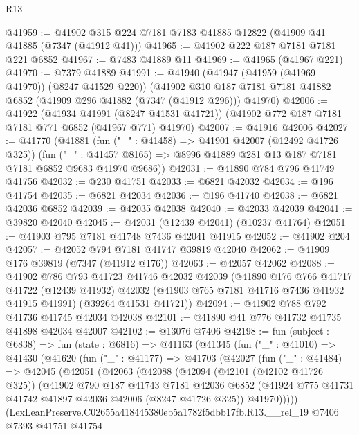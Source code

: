 \begin{lexlean}{R13}
\begin{coremodule}
@41959 := @41902 @315 @224 @7181 @7183 @41885 @12822 (@41909 @41 @41885 (@7347 (@41912 @41)))
@41965 := @41902 @222 @187 @7181 @7181 @221 @6852
@41967 := @7483 @41889 @11
@41969 := @41965 (@41967 @221)
@41970 := @7379 @41889
@41991 := @41940
    (@41947 (@41959 (@41969 @41970)) (@8247 @41529 @220))
    (@41902 @310 @187 @7181 @7181 @41882 @6852 (@41909 @296 @41882 (@7347 (@41912 @296))) @41970)
@42006 := @41922
    (@41934 @41991 (@8247 @41531 @41721))
    (@41902 @772 @187 @7181 @7181 @771 @6852 (@41967 @771) @41970)
@42007 := @41916 @42006
@42027 := @41770
    (@41881
      (fun ("_" : @41458) => @41901 @42007 (@12492 @41726 @325))
      (fun ("_" : @41457 @8165) => @8996 @41889 @281 @13 @187 @7181 @7181 @6852 @9683 @41970 @9686))
@42031 := @41890 @784 @796 @41749 @41756
@42032 := @230 @41751
@42033 := @6821 @42032
@42034 := @196 @41754
@42035 := @6821 @42034
@42036 := @196 @41740
@42038 := @6821 @42036 @6852
@42039 := @42035 @42038
@42040 := @42033 @42039
@42041 := @39820 @42040
@42045 := @42031 (@12439 @42041) (@10237 @41764)
@42051 := @41903 @795 @7181 @41748 @7436 @42041 @41915
@42052 := @41902 @204
@42057 := @42052 @794 @7181 @41747 @39819 @42040
@42062 := @41909 @176 @39819 (@7347 (@41912 @176))
@42063 := @42057 @42062
@42088 := @41902
    @786
    @793
    @41723
    @41746
    @42032
    @42039
    (@41890
      @176
      @766
      @41717
      @41722
      (@12439 @41932)
      @42032
      (@41903 @765 @7181 @41716 @7436 @41932 @41915 @41991)
      (@39264 @41531 @41721))
@42094 := @41902 @788 @792 @41736 @41745 @42034 @42038
@42101 := @41890 @41 @776 @41732 @41735 @41898 @42034 @42007
@42102 := @13076 @7406
@42198 := fun (subject : @6838) =>
  fun (state : @6816) =>
  @41163
    (@41345
      (fun ("_" : @41010) =>
      @41430
        (@41620
          (fun ("_" : @41177) =>
          @41703
            (@42027
              (fun ("_" : @41484) =>
              @42045
                (@42051
                  (@42063
                    (@42088
                      (@42094
                        (@42101 (@42102 @41726 @325))
                        (@41902
                          @790
                          @187
                          @41743
                          @7181
                          @42036
                          @6852
                          (@41924 @775 @41731 @41742 @41897 @42036 @42006 (@8247 @41726 @325))
                          @41970)))))
                (LexLeanPreserve.C02655a418445380eb5a1782f5dbb17fb.R13.__rel_19
                  @7406
                  @7393
                  @41751
                  @41754

\end{coremodule}
\end{lexlean}
